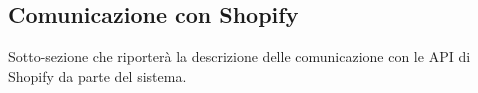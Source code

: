 \subsection{Comunicazione con Shopify}

Sotto-sezione che riporterà la descrizione delle comunicazione con le API di Shopify da parte del sistema.
